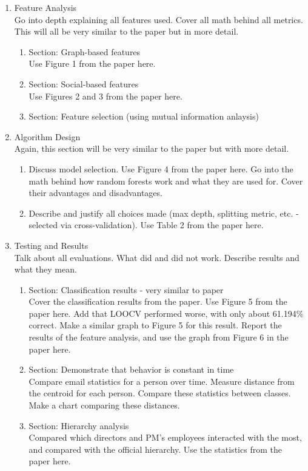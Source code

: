 \documentclass[12pt,dvips]{report}
\begin{document}
\begin{enumerate}
\item Feature Analysis\\
Go into depth explaining all features used.  Cover all math behind all metrics.  This will all be very similar to the paper but in more detail.
\begin{enumerate}
\item Section: Graph-based features\\
Use Figure 1 from the paper here.
\item Section: Social-based features\\
Use Figures 2 and 3 from the paper here.
\item Section: Feature selection (using mutual information anlaysis)
\end{enumerate}

\item Algorithm Design\\
Again, this section will be very similar to the paper but with more detail.
\begin{enumerate}
\item Discuss model selection.  Use Figure 4 from the paper here.  Go into the math behind how random forests work and what they are used for.  Cover their advantages and disadvantages.  
\item Describe and justify all choices made (max depth, splitting metric, etc. - selected via cross-validation).  Use Table 2 from the paper here.
\end{enumerate}

\item Testing and Results \\
Talk about all evaluations.  What did and did not work.  Describe results and what they mean.
\begin{enumerate}
\item Section: Classification results - very similar to paper\\
Cover the classification results from the paper.  Use Figure 5 from the paper here.  Add that LOOCV performed worse, with only about 61.194\% correct.  Make a similar graph to Figure 5 for this result.  Report the results of the feature analysis, and use the graph from Figure 6 in the paper here.
\item Section: Demonstrate that behavior is constant in time\\
Compare email statistics for a person over time.  Measure distance from the centroid for each person.  Compare these statistics between classes.  Make a chart comparing these distances.
\item Section: Hierarchy analysis\\
Compared which directors and PM's employees interacted with the most, and compared with the official hierarchy.  Use the statistics from the paper here.


\end{enumerate}
\end{enumerate}
\end{document}
